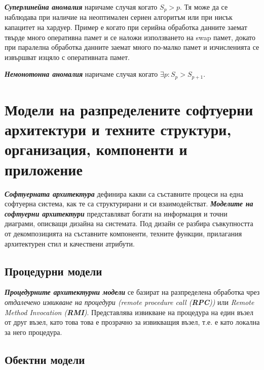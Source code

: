 \documentclass[fleqn,12pt]{article}
\begin{document}
\textbf{\textit{Суперлинейна аномалия}} наричаме случая когато $S_p > p$.
Тя може да се наблюдава при наличие на неоптимален сериен алгоритъм или при нисък капацитет на хардуер.
Пример е когато при серийна обработка данните заемат твърде много оперативна памет и се наложи използването на swap памет, докато при паралелна обработка данните заемат много по-малко памет и изчисленията се извършват изцяло с оперативната памет.

\textbf{\textit{Немонотонна аномалия}} наричаме случая когато $\exists p: S_p > S_{p+1}$.

\section{Модели на разпределените софтуерни архитектури и техните структури, организация, компоненти и приложение}


\textbf{\textit{Софтуерната архитектура}} дефинира какви са съставните процеси на една софтуерна система, как те са структурирани и си взаимодействат.
\textbf{\textit{Моделите на софтуерни архитектури}} представляват богати на информация и точни диаграми, описващи дизайна на системата.
Под дизайн се разбира съвкупността от декомпозицията на съставните компоненти, техните функции, прилагания архитектурен стил и качествени атрибути.

\subsection{Процедурни модели}

\textbf{\textit{Процедурните архитектурни модели}} се базират на разпределена обработка чрез \textit{отдалечено извикване на процедури (remote procedure call (\textbf{RPC}))} или \textit{Remote Method Invocation (\textbf{RMI})}.
Представлява извикване на процедура на един възел от друг възел, като това това е прозрачно за извикващия възел, т.е. е като локална за него процедура.

\subsection{Обектни модели}
\end{document}
